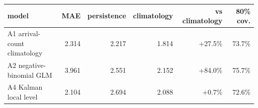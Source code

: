 \begin{tabular}{lrrrrr}
\toprule
model & MAE & persistence & climatology & vs climatology & 80\% cov. \\
\midrule
  A1 arrival-count climatology & 2.314 & 2.217 & 1.814 & +27.5\% & 73.7\% \\
  A2 negative-binomial GLM & 3.961 & 2.551 & 2.152 & +84.0\% & 75.7\% \\
  A4 Kalman local level & 2.104 & 2.694 & 2.088 & +0.7\% & 72.6\% \\
\bottomrule
\end{tabular}

